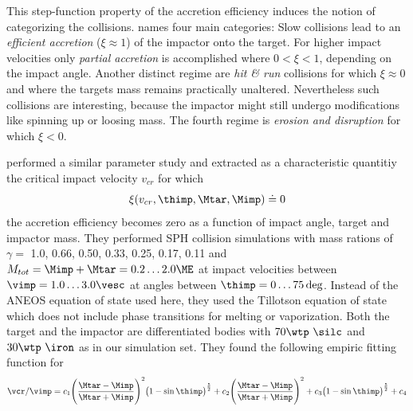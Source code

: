 This step-function property of the accretion efficiency induces the notion of categorizing the collisions. \cite{Asphaug:2010p3539} names four main categories: Slow collisions lead to an \emph{efficient accretion} ($\xi \approx 1$) of the impactor onto the target. For higher impact velocities only \emph{partial accretion} is accomplished where $0 < \xi <1$, depending on the impact angle. Another distinct regime are \emph{hit \& run} collisions \citep{Asphaug:2006p3729} for which $\xi \approx 0$ and where the targets mass remains practically unaltered. Nevertheless such collisions are interesting, because the impactor might still undergo modifications like spinning up or loosing mass. The fourth regime is \emph{erosion and disruption} for which $\xi < 0$.

\cite{2010ApJ...714L..21K} performed a similar parameter study and extracted as a characteristic quantitiy the critical impact velocity $v_{cr}$ for which
\begin{equation}
\xi(v_{cr}, \thimp, \Mtar, \Mimp) \doteq 0
\end{equation}
the accretion efficiency becomes zero as a function of impact angle, target and impactor mass. They performed SPH collision simulations with mass rations of $\gamma =$ 1.0, 0.66, 0.50, 0.33, 0.25, 0.17, 0.11 and $M_{tot} = \Mimp + \Mtar = 0.2 \dots 2.0 \ME$ at impact velocities between $\vimp = 1.0 \dots 3.0 \vesc$ at angles between $\thimp = 0 \dots 75 \deg$. Instead of the ANEOS equation of state used here, they used the Tillotson equation of state \cite{Melosh:1989p996} which does not include phase transitions for melting or vaporization. Both the target and the impactor are differentiated bodies with $70 \wtp~\silc$ and $30 \wtp~\iron$ as in our \css simulation set. They found the following empiric fitting function for
\begin{equation}
\label{ch03_eq002}
\vcr / \vimp = c_1 \Bigg( \frac{\Mtar - \Mimp}{\Mtar + \Mimp} \Bigg)^2 \big( 1 - \sin{\thimp} \big)^\frac{5}{2} + c_2 \Bigg( \frac{\Mtar - \Mimp}{\Mtar + \Mimp} \Bigg)^2 + c_3 \big( 1 - \sin{\thimp} \big)^\frac{5}{2}  + c_4
\end{equation}
